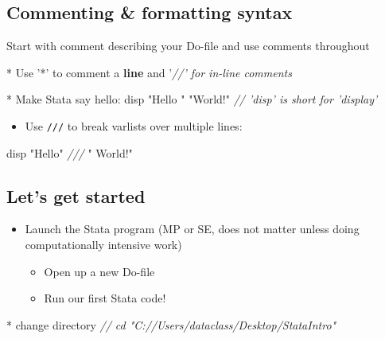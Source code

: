 \documentclass[]{book}
\newenvironment{Shaded}{\begin{snugshade}}{\end{snugshade}}
\newcommand{\CommentTok}[1]{\textcolor[rgb]{0.56,0.35,0.01}{\textit{#1}}}
\newcommand{\KeywordTok}[1]{\textcolor[rgb]{0.13,0.29,0.53}{\textbf{#1}}}
\newcommand{\NormalTok}[1]{#1}
\newcommand{\StringTok}[1]{\textcolor[rgb]{0.31,0.60,0.02}{#1}}
\providecommand{\tightlist}{%
  \setlength{\itemsep}{0pt}\setlength{\parskip}{0pt}}
\begin{document}
\hypertarget{commenting-formatting-syntax}{%
\subsection{Commenting \& formatting syntax}\label{commenting-formatting-syntax}}

Start with comment describing your Do-file and use comments throughout

\begin{Shaded}
\begin{Highlighting}[]
\NormalTok{* Use '*' to comment a }\KeywordTok{line}\NormalTok{ and '}\CommentTok{//' for in-line comments}

\NormalTok{* Make Stata say hello:}
\NormalTok{disp }\StringTok{"Hello "} \StringTok{"World!"} \CommentTok{// 'disp' is short for 'display'}
\end{Highlighting}
\end{Shaded}

\begin{itemize}
\tightlist
\item
  Use \texttt{///} to break varlists over multiple lines:
\end{itemize}

\begin{Shaded}
\begin{Highlighting}[]
\NormalTok{disp }\StringTok{"Hello"} \CommentTok{///}
     \StringTok{" World!"}
\end{Highlighting}
\end{Shaded}

\hypertarget{lets-get-started}{%
\subsection{Let's get started}\label{lets-get-started}}

\begin{itemize}
\tightlist
\item
  Launch the Stata program (MP or SE, does not matter unless doing computationally intensive work)

  \begin{itemize}
  \tightlist
  \item
    Open up a new Do-file
  \item
    Run our first Stata code!
  \end{itemize}
\end{itemize}

\begin{Shaded}
\begin{Highlighting}[]
\NormalTok{* change directory}
\CommentTok{// cd "C://Users/dataclass/Desktop/StataIntro"}
\end{Highlighting}
\end{Shaded}
\end{document}
